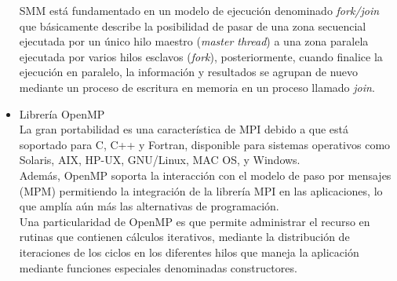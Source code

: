 \begin{itemize}
	SMM está fundamentado en un modelo de ejecución denominado \textit{fork/join} que básicamente describe la posibilidad de pasar de una zona secuencial ejecutada por un único hilo maestro (\textit{master thread}) a una zona paralela ejecutada por varios hilos esclavos (\textit{fork}), posteriormente, cuando finalice la ejecución en paralelo, la información y resultados se agrupan de nuevo mediante un proceso de escritura en memoria en un proceso llamado \textit{join}.\\

	\item Librería OpenMP
	\\
	La gran portabilidad es una característica de MPI debido a que está soportado para C, C++ y Fortran, disponible para sistemas operativos como Solaris, AIX, HP-UX, GNU/Linux, MAC OS, y Windows.\\
	Además, OpenMP soporta la interacción con el modelo de paso por mensajes (MPM) permitiendo la integración de la librería MPI en las aplicaciones, lo que amplía aún más las alternativas de programación.\\
	Una particularidad de OpenMP es que permite administrar el recurso en rutinas que contienen cálculos iterativos, mediante la distribución de iteraciones de los ciclos en los diferentes hilos que maneja la aplicación mediante funciones especiales denominadas constructores.
\\			
	
\end{itemize}   
